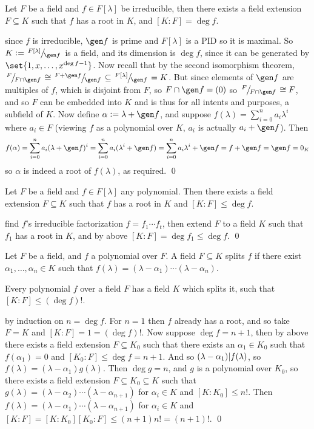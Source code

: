 \bprop

    Let $F$ be a field and $f\in F[\lambda]$ be irreducible, then there exists a field extension $F\subseteq K$ such that $f$ has a root in $K$, and $[K:F]=\deg f$.

\eprop

\Proof since $f$ is irreducible, $\gen f$ is prime and $F[\lambda]$ is a PID so it is maximal.
So $K\coloneqq\slfrac{F[\lambda]}{\gen f}$ is a field, and its dimension is $\deg f$, since it can be generated by $\set{1,x,\dots,x^{\deg f-1}}$.
Now recall that by the second isomorphism theorem, $\slfrac F{F\cap\gen f}\cong\slfrac{F+\gen f}{\gen f}\subseteq\slfrac{F[\lambda]}{\gen f}=K$.
But since elements of $\gen f$ are multiples of $f$, which is disjoint from $F$, so $F\cap\gen f=(0)$ so $\slfrac F{F\cap\gen f}\cong F$, and so $F$ can be embedded into $K$ and is thus for all intents and
purposes, a subfield of $K$.
Now define $\alpha\coloneqq\lambda+\gen f$, and suppose $f(\lambda)=\sum_{i=0}^n a_i\lambda^i$ where $a_i\in F$ (viewing $f$ as a polynomial over $K$, $a_i$ is actually $a_i+\gen f$).
Then
$$ f(\alpha) = \sum_{i=0}^na_i(\lambda + \gen f)^i = \sum_{i=0}^na_i(\lambda^i+\gen f) = \sum_{i=0}^na_i\lambda^i + \gen f = f + \gen f = \gen f = 0_K $$
so $\alpha$ is indeed a root of $f(\lambda)$, as required.
\qed

\bcoro

    Let $F$ be a field and $f\in F[\lambda]$ any polynomial.
    Then there exists a field extension $F\subseteq K$ such that $f$ has a root in $K$ and $[K:F]\leq\deg f$.

\ecoro

\Proof find $f$'s irreducible factorization $f=f_1\cdots f_t$, then extend $F$ to a field $K$ such that $f_1$ has a root in $K$, and by above $[K:F]=\deg f_1\leq\deg f$.
\qed

\bdefn

    Let $F$ be a field, and $f$ a polynomial over $F$.
    A field $F\subseteq K$ {\emphcolor splits $f$} if there exist $\alpha_1,\dots,\alpha_n\in K$ such that $f(\lambda)=(\lambda-\alpha_1)\cdots(\lambda-\alpha_n)$.

\edefn

\bthrm

    Every polynomial $f$ over a field $F$ has a field $K$ which splits it, such that $[K:F]\leq(\deg f)!$.

\ethrm

\Proof by induction on $n=\deg f$.
For $n=1$ then $f$ already has a root, and so take $F=K$ and $[K:F]=1=(\deg f)!$.
Now suppose $\deg f=n+1$, then by above there exists a field extension $F\subseteq K_0$ such that there exists an $\alpha_1\in K_0$ such that $f(\alpha_1)=0$ and $[K_0:F]\leq\deg f=n+1$.
And so $(\lambda-\alpha_1){\mid} f(\lambda)$, so $f(\lambda)=(\lambda-\alpha_1)g(\lambda)$.
Then $\deg g=n$, and $g$ is a polynomial over $K_0$, so there exists a field extension $F\subseteq K_0\subseteq K$ such that $g(\lambda)=(\lambda-\alpha_2)\cdots(\lambda-\alpha_{n+1})$ for $\alpha_i\in K$
and $[K:K_0]\leq n!$.
Then $f(\lambda)=(\lambda-\alpha_1)\cdots(\lambda-\alpha_{n+1})$ for $\alpha_i\in K$ and $[K:F]=[K:K_0][K_0:F]\leq (n+1)n!=(n+1)!$.
\qed

